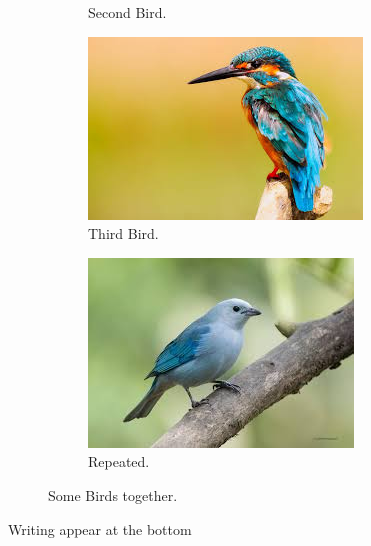 \documentclass[a4paper,12pt]{article}
\begin{document}
{\begin{figure}[h!]
\begin{subfigure}[b]{0.2\linewidth}
\caption{Second  Bird.}
\end{subfigure}
\begin{subfigure}[b]{0.2\linewidth}
\includegraphics[width=\linewidth]{bird2}
\caption{Third  Bird.}
\end{subfigure}
\begin{subfigure}[b]{0.2\linewidth}
\includegraphics[width=\linewidth]{bird}
\caption{Repeated.}
\end{subfigure}
\caption{Some Birds together.}
\label{fig:Birds}
\end{figure}
Writing appear at the bottom

\newpage

}
\end{document}
